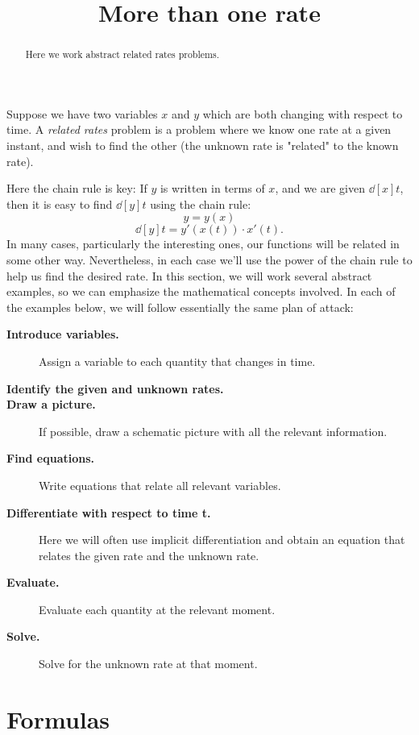 \documentclass{ximera}
\title[Dig-In:]{More than one rate}
\begin{document}
\begin{abstract}
  Here we work abstract related rates problems.
\end{abstract}
\maketitle


Suppose we have two variables $x$ and $y$ which are both changing with
respect to time.  A \textit{related rates} problem is a problem where
we know one rate at a given instant, and wish to find the other (the unknown rate is "related" to the known rate).

Here the chain rule is key: If $y$ is written in terms of $x$, and we
are given $\dd[x]{t}$, then it is easy to find $\dd[y]{t}$ using the
chain rule:
\[
y=y(x)
\]
\[
\dd[y]{t}=y'(x(t))\cdot x'(t).
\]
In many cases, particularly the interesting ones, our functions will
be related in some other way. Nevertheless, in each case we'll use the
power of the chain rule to help us find the desired rate. In this
section, we will work several abstract examples, so we can emphasize
the mathematical concepts involved. In each of the examples below, we
will follow essentially the same plan of attack:



\begin{description}
\item[\textbf{Introduce variables.}] Assign a variable to each quantity that changes in time.
\item[\textbf{Identify the given and unknown rates.}] 
\item[\textbf{Draw a picture.}] If possible, draw a schematic picture with all the relevant information. 
\item[\textbf{Find equations.}] Write equations that relate all
  relevant variables.
\item[\textbf{Differentiate with respect to time t.}] Here we will often use
  implicit differentiation and obtain an equation that relates the given rate and the unknown rate. 
\item[\textbf{Evaluate.}] Evaluate
each quantity at the  relevant moment.
 \item[\textbf{Solve.}] Solve
 for the unknown rate at that moment.
\end{description}




\section{Formulas}
\end{document}
